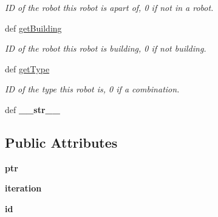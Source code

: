 \begin{DoxyCompactItemize}
\begin{DoxyCompactList}\small\item\em ID of the robot this robot is apart of, 0 if not in a robot. \item\end{DoxyCompactList}\item 
\hypertarget{classGameObject_1_1Bot_a8629a4748225228f6b6d65fb3a9982d6}{
def \hyperlink{classGameObject_1_1Bot_a8629a4748225228f6b6d65fb3a9982d6}{getBuilding}}
\label{classGameObject_1_1Bot_a8629a4748225228f6b6d65fb3a9982d6}

\begin{DoxyCompactList}\small\item\em ID of the robot this robot is building, 0 if not building. \item\end{DoxyCompactList}\item 
\hypertarget{classGameObject_1_1Bot_a98e2b4a8d933ec347826c89b57304b6e}{
def \hyperlink{classGameObject_1_1Bot_a98e2b4a8d933ec347826c89b57304b6e}{getType}}
\label{classGameObject_1_1Bot_a98e2b4a8d933ec347826c89b57304b6e}

\begin{DoxyCompactList}\small\item\em ID of the type this robot is, 0 if a combination. \item\end{DoxyCompactList}\item 
\hypertarget{classGameObject_1_1Bot_a9d9b75c68d6ccef5fbabc407cacbc9f5}{
def {\bfseries \_\-\_\-str\_\-\_\-}}
\label{classGameObject_1_1Bot_a9d9b75c68d6ccef5fbabc407cacbc9f5}

\end{DoxyCompactItemize}
\subsection*{Public Attributes}
\begin{DoxyCompactItemize}
\item 
\hypertarget{classGameObject_1_1Bot_afc115a9af2389b809a3e33aa3deb31dd}{
{\bfseries ptr}}
\label{classGameObject_1_1Bot_afc115a9af2389b809a3e33aa3deb31dd}

\item 
\hypertarget{classGameObject_1_1Bot_a299e4ce1e2b005f955ce4b8032e1e1c4}{
{\bfseries iteration}}
\label{classGameObject_1_1Bot_a299e4ce1e2b005f955ce4b8032e1e1c4}

\item 
\hypertarget{classGameObject_1_1Bot_a964267f61141849cd7eea884de9d5259}{
{\bfseries id}}
\label{classGameObject_1_1Bot_a964267f61141849cd7eea884de9d5259}

\end{DoxyCompactItemize}



